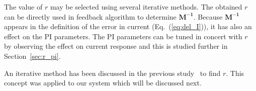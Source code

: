 The value of $r$ may be selected using several iterative methods. The obtained $r$ can be directly used in feedback algorithm to determine $\bm{M^{-1}}$. Because $\bm{M^{-1}}$ appears in the definition of the error in current (Eq.~(\ref{eq:del_I})), it has also an effect on the PI parameters. The PI parameters can be tuned in concert with $r$ by observing the effect on current response and this is studied further in Section~\ref{sec:r_pi}.


An iterative method has been discussed in the previous study~\cite{bea} to find $r$. This concept was applied to our system which will be discussed next.











